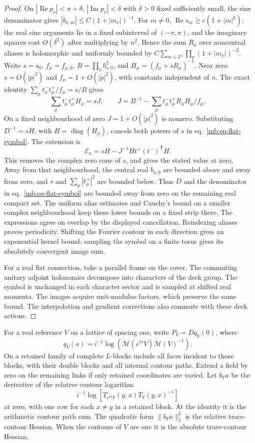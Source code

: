 \documentclass[11pt,letterpaper,reqno]{amsart}
\numberwithin{equation}{section}
\renewcommand{\eqref}[1]{\textup{eq.~\ref{#1}}}
\theoremstyle{definition}
\theoremstyle{remark}
\begin{document}
\begin{proof}
On \(|\operatorname{Re}p_\nu|<\pi+\delta\),
\(|\operatorname{Im}p_\nu|<\delta\) with \(\delta>0\) fixed
sufficiently small, the sine denominator gives
\(\left|b_{\nu,m}\right|\le C(1+|m_\nu|)^{-1}\).
For \(m\ne0\), \(\operatorname{Re}s_m\ge c(1+|m|^2)\):
the real sine arguments lie in a fixed subinterval of
\((- \pi,\pi)\), and the imaginary squares cost \(O(\delta^2)\)
after multiplying by \(n^2\). Hence the sum \(R_\mu\) over
noncentral aliases is holomorphic and uniformly bounded by
\(C\sum_{m\in\mathbb Z^4}\prod_\nu(1+|m_\nu|)^{-2}\).
Write \(s=s_0\), \(f_\mu=f_{\mu,0}\),
\(B=\prod_\nu b_{\nu,0}^2\), and
\(H_\mu=(f_\mu+s R_\mu)^{-1}\).
Near zero \(s=O(|p|^2)\) and \(f_\mu=1+O(|p|^2)\), with
constants independent of \(n\). The exact identity
\(\sum_\mu t_\mu^-t_\mu^+/f_\mu=s/B\) gives
\[
 \sum_\mu t_\mu^-t_\mu^+H_\mu=s J,\qquad
 J=B^{-1}-\sum_\mu t_\mu^-t_\mu^+R_\mu H_\mu/f_\mu .
\]
On a fixed neighbourhood of zero \(J=1+O(|p|^2)\) is
nonzero. Substituting \(D^{-1}=sH\), with
\(H=\operatorname{diag}(H_\mu)\), cancels both powers of \(s\)
in \eqref{mb:eq-flat-symbol}. The extension is
\[
       \mathcal E_n=sH-J^{-1}Ht^+(t^-)^{\mathsf T}H .
\]
This removes the complex zero cone of \(s\), and gives the
stated value at zero. Away from that neighbourhood, the
central real \(b_{\nu,0}\) are bounded above and away from
zero, and \(s\) and \(\sum_\mu|t_\mu^+|^2\) are bounded
below. Thus \(D\) and the denominator in
\eqref{mb:eq-flat-symbol} are bounded away from zero on the
remaining real compact set. The uniform alias estimates
and Cauchy's bound on a smaller complex neighbourhood keep
these lower bounds on a fixed strip there. The expressions
agree on overlap by the displayed cancellation. Reindexing
aliases proves periodicity. Shifting the Fourier contour in
each direction gives an exponential kernel bound; sampling
the symbol on a finite torus gives its absolutely convergent
image sum.

For a real flat connection, take a parallel frame on the
cover. The commuting unitary adjoint holonomies decompose
into characters of the deck group. The symbol is unchanged
in each character sector and is sampled at shifted real
momenta. The images acquire unit-modulus factors, which
preserve the same bound. The interpolation and gradient
corrections also commute with these deck actions.
\end{proof}

For a real reference \(V\) on a lattice of spacing one, write
\(P_V=D q_V(0)\), where
\[
 q_V(a)=i^{-1}\log(\mathcal M(e^{ia}V)\mathcal M(V)^{-1}).
\]
On a retained family of complete \(L\)-blocks include all
faces incident to those blocks, with their double blocks and
all internal contour paths. Extend a field by zero on the
remaining links if only retained coordinates are varied.
Let \(b_V a\) be the derivative of the relative contour
logarithm
\[
 i^{-1}\log[T_{e^{ia}V}(y,x)T_V(y,x)^{-1}]
\]
at zero, with one row
for each \(x\ne y\) in a retained block. At the identity it
is the arithmetic contour path sum. The quadratic form
\(\|b_V a\|_2^2\) is the relative trace-contour Hessian.
When the contours of \(V\) are one it is the absolute
trace-contour Hessian.
\end{document}
